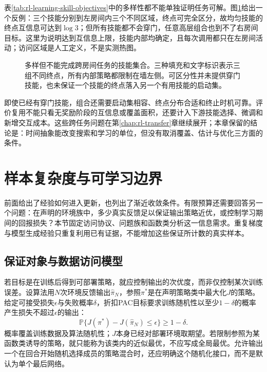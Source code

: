 表\ref{tab:rl-learning-skill-objectives}中的多样性都不能单独证明任务可解。图\ref{fig:rl-learning-skill-regions}给出一个反例：三个技能分别到左房间内三个不同区域，终点可完全区分，故均匀技能的终点互信息可达到$\log3$；但所有技能都不会穿门，任意高层组合也到不了右房间目标。这里为说明达到互信息上限，技能内部均确定，且每次调用都只在左房间活动；访问区域是人工定义，不是实测热图。

\begin{figure}[t]
  \centering
  
  \caption{多样但不能完成跨房间任务的技能集合。三种填充和文字标识表示三组不同终点，所有内部策略都限制在墙左侧。可区分性并未提供穿门技能，也未保证一个技能的终点落入另一个有用技能的启动集。}
  \label{fig:rl-learning-skill-regions}
\end{figure}

即使已经有穿门技能，组合还需要启动集相容、终点分布合适和终止时机可靠。评价复用不能只看无奖励阶段的互信息或覆盖面积，还要计入下游技能选择、微调和新增交互成本。这些跨任务问题在第\ref{chap:rl-transfer}章继续展开；本章保留的结论是：时间抽象能改变搜索和学习的单位，但没有取消覆盖、估计与优化三方面的条件。

\section{样本复杂度与可学习边界}
\label{sec:rl-learning-statistical-limits}

前面给出了经验如何进入更新，也列出了渐近收敛条件。有限预算还需要回答另一个问题：在声明的环境族中，多少真实反馈足以保证输出策略近优，或控制学习期间的回报损失？本节固定访问协议、问题族和函数类分析这一信息需求。重复梯度与模型生成经验只重复利用已有证据，不能增加这些保证所计数的真实样本。

\subsection{保证对象与数据访问模型}
\label{sec:rl-learning-guarantees-access}

若目标是在训练后得到可部署策略，就应控制输出的次优度，而非仅控制某次训练误差。设算法用$N$次环境反馈输出$\widehat\pi_N$，参照$\pi^*$是在声明策略类中最大化$J$的策略。给定可接受损失$\epsilon$与失败概率$\delta$，折扣PAC目标要求训练随机性以至少$1-\delta$的概率产生损失不超过$\epsilon$的输出：
\begin{equation}
 \mathbb P\{J(\pi^*)-J(\widehat\pi_N)\leq\epsilon\}
                       \geq1-\delta.
 \label{eq:rl-learning-pac}
\end{equation}
概率覆盖训练数据及算法随机性；$J$本身已经对部署环境取期望。若限制参照为某函数类诱导的策略，就只能称为该类内的近似最优，不应写成全局最优。允许输出一个在回合开始随机选择成员的策略混合时，还应明确这个随机化接口，而不是默认为单个最后网络。

